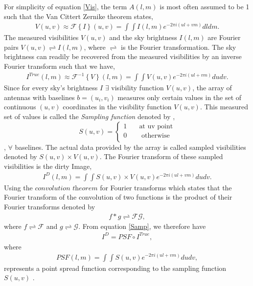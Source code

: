 For simplicity of equation \ref{Vis}, the term $A(l,m)$ is most often assumed to be 1 such that the Van Cittert Zernike theorem states, \citep{thompson2017interferometry}
\begin{align}
V(u,v)\approx \mathcal{F}\left\{I\right\}(u,v)=\int \int I (l,m)e^{-2\pi i(ul+vm)} dl dm.
\label{V}
\end{align}
The measured visibilities $V(u,v)$ and the sky brightness  $I(l,m)$ are Fourier pairs $V(u,v) \rightleftharpoons I(l,m)$, where $\rightleftharpoons$ is the Fourier transformation. The sky
brightness can readily be recovered from the measured visibilities by an inverse Fourier transform such that we have, 
\begin{align}
I^{True}(l,m)\approx \mathcal{F}^{-1}\left\{V\right\}(l,m)=\int \int V (u,v)e^{-2\pi i(ul+vm)} du dv .
\end{align}
Since for every sky's brightness $I$ $\exists$ visibility function $V(u,v)$, the array of antennas with baselines $b=(u_i,v_i)$  measures only certain values in the set of continuous  $(u,v)$ coordinates in the visibility function $V(u,v)$. This measured set of values is called the \emph{Sampling function} denoted by \citep{taylor1999synthesis}, \[ S(u,v) =
  \begin{cases}
    1   & \quad    \text{at uv point}\\
    0  & \quad  \text{ otherwise}\\
  \end{cases}
\], $\forall$ baselines. The actual data provided by the array is called  sampled visibilities denoted by  $S(u,v)\times V(u,v)$. The Fourier transform of these sampled visibilities is the dirty Image,
\begin{align}
I^{D}(l,m)=\int \int S(u,v)\times V(u,v) e^{-2\pi i(ul+vm)} du dv.
\label{Samp}
\end{align} 
Using the $\textit{convolution theorem}$ for Fourier transforms which states that the Fourier transform of the convolution of two functions is the product of their Fourier transforms denoted by 
\begin{align}
f*g\rightleftharpoons \mathcal{F} \mathcal{G},
\end{align}
where $f\rightleftharpoons \mathcal{F}$ and $g\rightleftharpoons \mathcal{G}$.
From equation \ref{Samp}, we therefore have 
\begin{align}
I^{D}=PSF \circ I^{True},
\end{align}
where 
\begin{align}
PSF(l,m) = \int \int S(u,v)e^{-2\pi i(ul+vm)} du dv,
\end{align}
represents a point spread function  corresponding to the sampling function $S(u,v)$ \citep{taylor1999synthesis}.


